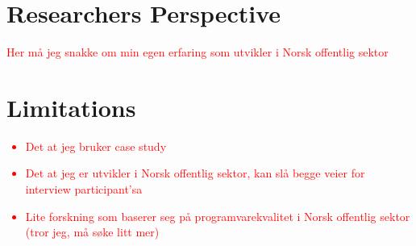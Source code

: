 \section{Researchers Perspective}
\textcolor{red}{Her må jeg snakke om min egen erfaring som utvikler i Norsk offentlig sektor}

\section{Limitations}
\textcolor{red}{\begin{itemize}
    \item Det at jeg bruker case study
    \item Det at jeg er utvikler i Norsk offentlig sektor, kan slå begge veier for interview participant'sa
    \item Lite forskning som baserer seg på programvarekvalitet i Norsk offentlig sektor (tror jeg, må søke litt mer)
\end{itemize}}